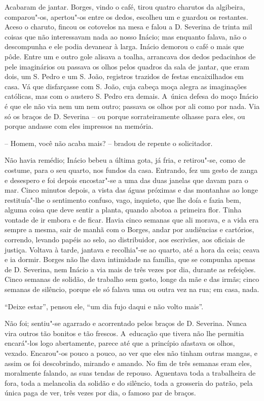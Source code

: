 Acabaram de jantar. Borges, vindo o café, tirou quatro charutos da
algibeira, comparou"-os, apertou"-os entre os dedos, escolheu um e guardou
os restantes. Aceso o charuto, fincou os cotovelos na mesa e falou a D.
Severina de trinta mil coisas que não interessavam nada ao nosso Inácio;
mas enquanto falava, não o descompunha e ele podia devanear à larga.
Inácio demorou o café o mais que pôde. Entre um e outro gole alisava a
toalha, arrancava dos dedos pedacinhos de pele imaginários ou passava os
olhos pelos quadros da sala de jantar, que eram dois, um S. Pedro e um
S. João, registros trazidos de festas encaixilhados em casa. Vá que
disfarçasse com S. João, cuja cabeça moça alegra as imaginações
católicas, mas com o austero S. Pedro era demais. A~única defesa do moço
Inácio é que ele não via nem um nem outro; passava os olhos por ali como
por nada. Via só os braços de D. Severina -- ou porque sorrateiramente
olhasse para eles, ou porque andasse com eles impressos na memória.

-- Homem, você não acaba mais? -- bradou de repente o solicitador.

Não havia remédio; Inácio bebeu a última gota, já fria, e retirou"-se,
como de costume, para o seu quarto, nos fundos da casa. Entrando, fez um
gesto de zanga e desespero e foi depois encostar"-se a uma das duas
janelas que davam para o mar. Cinco minutos depois, a vista das águas
próximas e das montanhas ao longe restituía"-lhe o sentimento confuso,
vago, inquieto, que lhe doía e fazia bem, alguma coisa que deve sentir a
planta, quando abotoa a primeira flor. Tinha vontade de ir embora e de
ficar. Havia cinco semanas que ali morava, e a vida era sempre a mesma,
sair de manhã com o Borges, andar por audiências e cartórios, correndo,
levando papéis ao selo, ao distribuidor, aos escrivães, aos oficiais de
justiça. Voltava à tarde, jantava e recolhia"-se ao quarto, até a hora da
ceia; ceava e ia dormir. Borges não lhe dava intimidade na família, que
se compunha apenas de D. Severina, nem Inácio a via mais de três vezes
por dia, durante as refeições. Cinco semanas de solidão, de trabalho sem
gosto, longe da mãe e das irmãs; cinco semanas de silêncio, porque ele
só falava uma ou outra vez na rua; em casa, nada.

``Deixe estar'', pensou ele, ``um dia fujo daqui e não volto mais''.

Não foi; sentiu"-se agarrado e acorrentado pelos braços de D. Severina.
Nunca vira outros tão bonitos e tão frescos. A~educação que tivera não
lhe permitia encará"-los logo abertamente, parece até que a princípio
afastava os olhos, vexado. Encarou"-os pouco a pouco, ao ver que eles não
tinham outras mangas, e assim os foi descobrindo, mirando e amando. No
fim de três semanas eram eles, moralmente falando, as suas tendas de
repouso. Aguentava toda a trabalheira de fora, toda a melancolia da
solidão e do silêncio, toda a grosseria do patrão, pela única paga de
ver, três vezes por dia, o famoso par de braços.

